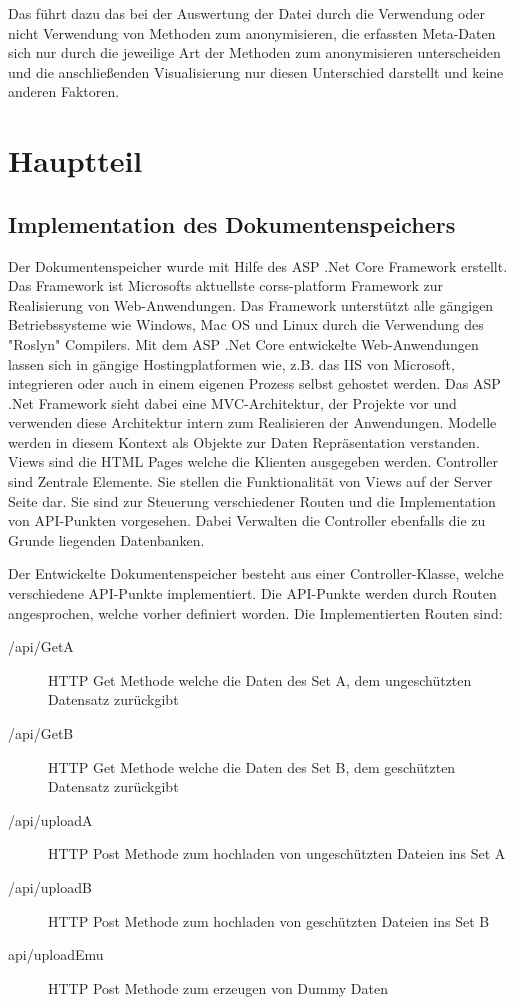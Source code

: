 \documentclass[
    fontsize=12pt,
    headings=small,
    parskip=half,           %
    bibliography=totoc,
    numbers=noenddot,       %
    open=any,               %
    ]{scrreprt}
\begin{document}
Das führt dazu das bei der Auswertung der Datei durch die Verwendung oder nicht Verwendung von Methoden zum anonymisieren, die erfassten Meta-Daten sich nur durch die jeweilige Art der Methoden zum anonymisieren unterscheiden und die anschließenden Visualisierung nur diesen Unterschied darstellt und keine anderen Faktoren. 


\chapter{Hauptteil}

\section{Implementation des Dokumentenspeichers}

Der Dokumentenspeicher wurde mit Hilfe des ASP .Net Core Framework erstellt. 
Das Framework ist Microsofts aktuellste corss-platform Framework zur Realisierung von Web-Anwendungen.
Das Framework unterstützt alle gängigen Betriebssysteme wie Windows, Mac OS und Linux durch die Verwendung des "Roslyn" Compilers.
Mit dem ASP .Net Core entwickelte Web-Anwendungen lassen sich in gängige Hostingplatformen wie, z.B. das IIS von Microsoft, integrieren oder auch in einem eigenen Prozess selbst gehostet werden. 
Das ASP .Net Framework sieht dabei eine MVC-Architektur, der Projekte vor und verwenden diese Architektur intern zum Realisieren der Anwendungen. 
Modelle werden in diesem Kontext als Objekte zur Daten Repräsentation verstanden. 
Views sind die HTML Pages welche die Klienten ausgegeben werden.
Controller sind Zentrale Elemente. 
Sie stellen die Funktionalität von Views auf der Server Seite dar.
Sie sind zur Steuerung verschiedener Routen und die Implementation von API-Punkten vorgesehen.
Dabei Verwalten die Controller ebenfalls die zu Grunde liegenden Datenbanken.

Der Entwickelte Dokumentenspeicher besteht aus einer Controller-Klasse, welche verschiedene API-Punkte implementiert. 
Die API-Punkte werden durch Routen angesprochen, welche vorher definiert worden. Die Implementierten Routen sind: 

\begin{description}
\item[/api/GetA] HTTP Get Methode welche die Daten des Set A, dem ungeschützten Datensatz zurückgibt 
\item[/api/GetB] HTTP Get Methode welche die Daten des Set B, dem geschützten Datensatz zurückgibt
\item[/api/uploadA] HTTP Post Methode zum hochladen von ungeschützten Dateien ins Set A
\item[/api/uploadB] HTTP Post Methode zum hochladen von geschützten Dateien ins Set B
\item[api/uploadEmu] HTTP Post Methode zum erzeugen von Dummy Daten
\end{description}
\end{document}
